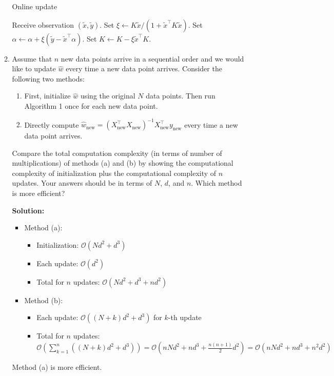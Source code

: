 \documentclass[a3paper,12pt]{extarticle} %
\begin{document}
\begin{enumerate}
\begin{enumerate}
            \begin{algorithm}
            \caption{Online update}
            \begin{algorithmic}[1]
                \State Receive observation \( (\tilde{x}, \tilde{y}) \).
                \State Set \( \xi \leftarrow K \tilde{x} / (1 + \tilde{x}^\top K \tilde{x}) \).
                \State Set \( \alpha \leftarrow \alpha + \xi (\tilde{y} - \tilde{x}^\top \alpha) \).
                \State Set \( K \leftarrow K - \xi \tilde{x}^\top K \).
            \end{algorithmic}
            \end{algorithm}
            \item Assume that \( n \) new data points arrive in a sequential order and we would like to update \( \hat{w} \) every time a new data point arrives. Consider the following two methods:
            \begin{enumerate}
                \item First, initialize \( \hat{w} \) using the original \( N \) data points. Then run Algorithm 1 once for each new data point.
                \item Directly compute \( \hat{w}_{\text{new}} = (X_{\text{new}}^\top X_{\text{new}})^{-1} X_{\text{new}}^\top y_{\text{new}} \) every time a new data point arrives.
            \end{enumerate}
            Compare the total computation complexity (in terms of number of multiplications) of methods (a) and (b) by showing the computational complexity of initialization plus the computational complexity of \( n \) updates. Your answers should be in terms of \( N \), \( d \), and \( n \). Which method is more efficient?

            \textbf{Solution:}
            \begin{itemize}
                \item Method (a):
                \begin{itemize}
                    \item Initialization: \( \mathcal{O}(Nd^2 + d^3) \)
                    \item Each update: \( \mathcal{O}(d^2) \)
                    \item Total for \( n \) updates: \( \mathcal{O}(Nd^2 + d^3 + nd^2) \)
                \end{itemize}
                \item Method (b):
                \begin{itemize}
                    \item Each update: \( \mathcal{O}((N+k)d^2 + d^3) \) for \( k \)-th update
                    \item Total for \( n \) updates: \( \mathcal{O}(\sum_{k=1}^n ((N+k)d^2 + d^3)) = \mathcal{O}(nNd^2 + nd^3 + \frac{n(n+1)}{2}d^2) = \mathcal{O}(nNd^2 + nd^3 + n^2d^2) \)
                \end{itemize}
            \end{itemize}
            Method (a) is more efficient.
        \end{enumerate}
\end{enumerate}
\end{document}
